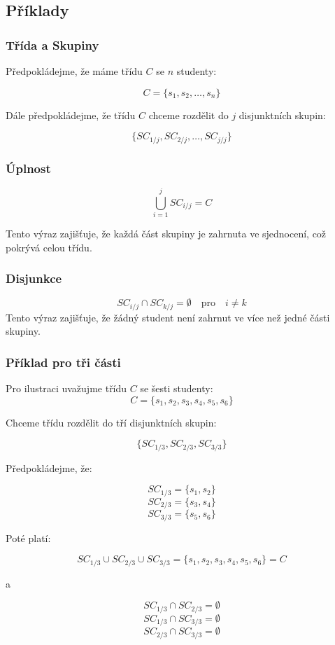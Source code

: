 \subsection*{Příklady}

\subsubsection*{Třída a Skupiny}

Předpokládejme, že máme třídu \( C \) se \( n \) studenty:

\[
C = \{ s_1, s_2, \ldots, s_n \}
\]

Dále předpokládejme, že třídu \( C \) chceme rozdělit do \( j \) disjunktních skupin:

\[
\{ SC_{1/j}, SC_{2/j}, \ldots, SC_{j/j} \}
\]

\subsubsection*{Úplnost}

\[
\bigcup_{i=1}^{j} SC_{i/j} = C
\]

Tento výraz zajišťuje, že každá část skupiny je zahrnuta ve sjednocení, což pokrývá celou třídu.

\subsubsection*{Disjunkce}

\[
SC_{i/j} \cap SC_{k/j} = \emptyset \quad \text{pro} \quad i \neq k
\]
Tento výraz zajišťuje, že žádný student není zahrnut ve více než jedné části skupiny.

\begin{samepage}
\subsubsection*{Příklad pro tři části}

Pro ilustraci uvažujme třídu \( C \) se šesti studenty:
\nopagebreak
\[
C = \{ s_1, s_2, s_3, s_4, s_5, s_6 \}
\]

\noindent
Chceme třídu rozdělit do tří disjunktních skupin:

\nopagebreak

\[
\{ SC_{1/3}, SC_{2/3}, SC_{3/3} \}
\]

\noindent
Předpokládejme, že:

\nopagebreak

\[
SC_{1/3} = \{ s_1, s_2 \}
\]
\[
SC_{2/3} = \{ s_3, s_4 \}
\]
\[
SC_{3/3} = \{ s_5, s_6 \}
\]

\noindent
Poté platí:

\[
SC_{1/3} \cup SC_{2/3} \cup SC_{3/3} = \{ s_1, s_2, s_3, s_4, s_5, s_6 \} = C
\]

\noindent
a

\[
SC_{1/3} \cap SC_{2/3} = \emptyset
\]
\[
SC_{1/3} \cap SC_{3/3} = \emptyset
\]
\[
SC_{2/3} \cap SC_{3/3} = \emptyset
\]
\end{samepage}

